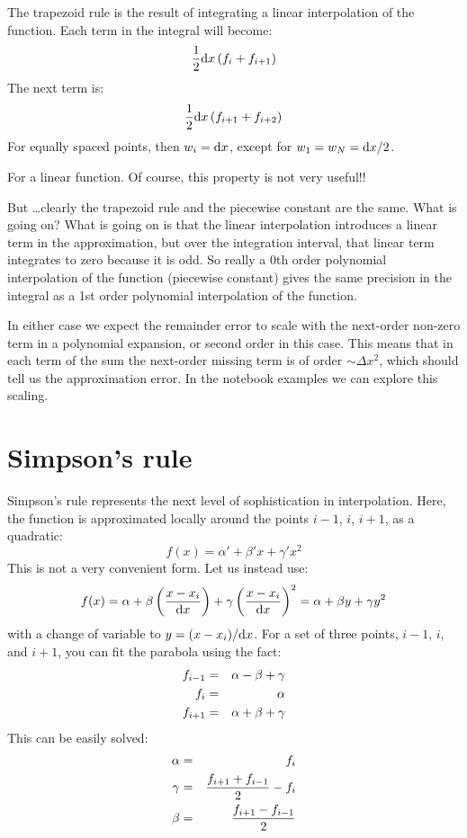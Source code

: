 The trapezoid rule is the result of integrating a linear interpolation
of the function. Each term in the integral will become:
\begin{equation}
\frac{1}{2} {\rm d}x \left( f_i + f_{i+1} \right) 
\end{equation}
The next term is:
\begin{equation}
\frac{1}{2} {\rm d}x \left( f_{i+1} + f_{i+2} \right) 
\end{equation}
For equally spaced points, then $w_i = {\rm d}x$, except for $w_1=
w_{N} = {\rm d}x/2$.


\begin{answer}
For a linear function. Of course, this property is not very useful!!
\end{answer}

But \ldots clearly the trapezoid rule and the piecewise constant are
the same. What is going on? What is going on is that the linear
interpolation introduces a linear term in the approximation, but over
the integration interval, that linear term integrates to zero because
it is odd. So really a 0th order polynomial interpolation of the
function (piecewise constant) gives the same precision in the integral
as a 1st order polynomial interpolation of the function.

In either case we expect the remainder error to scale with the
next-order non-zero term in a polynomial expansion, or second order in
this case. This means that in each term of the sum the next-order
missing term is of order $\sim \Delta x^2$, which should tell us the
approximation error. In the notebook examples we can explore this
scaling.

\section{Simpson's rule}

Simpson's rule represents the next level of sophistication in
interpolation. Here, the function is approximated locally around the
points $i-1$, $i$, $i+1$, as a quadratic:
\begin{equation}
f(x) = \alpha' + \beta' x + \gamma' x^2
\end{equation}
This is not a very convenient form. Let us instead use:
\begin{equation}
  f(x) = \alpha + \beta \left(\frac{x - x_i}{{\rm d}x}\right) +
  \gamma \left(\frac{x - x_i}{{\rm d}x}\right)^2 = 
  \alpha + \beta y
  + \gamma y^2
\end{equation}
with a change of variable to $y = (x-x_i)/{\rm d}x$.  For a set of
three points, $i-1$, $i$, and $i+1$, you can fit the parabola using
the fact:
\begin{eqnarray}
f_{i-1} &=& \alpha - \beta + \gamma \cr
f_{i} &=& \alpha \cr
f_{i+1} &=& \alpha + \beta + \gamma
\end{eqnarray}
This can be easily solved:
\begin{eqnarray}
\alpha &=& f_i \cr
\gamma &=& \frac{f_{i+1}+f_{i-1}}{2} - f_i \cr
\beta &=& \frac{f_{i+1}-f_{i-1}}{2}
\end{eqnarray}


